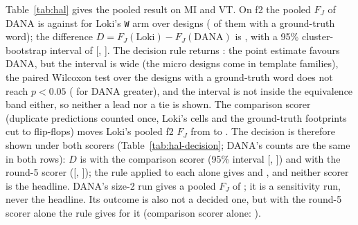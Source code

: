 \documentclass[conference]{IEEEtran}
\newcommand{\code}[1]{\texttt{#1}}
\begin{document}
Table~\ref{tab:hal} gives the pooled result on MI and VT. On f2 the pooled $F_J$ of DANA is
\halFoneHal{} against \halFoneLoki{} for Loki's \code{W} arm over \halDesigns{} designs
(\halDesignsGt{} of them with a ground-truth word); the difference
$D = F_J(\text{Loki}) - F_J(\text{DANA})$ is \halD{}, with a 95\% cluster-bootstrap interval of
[\halCiLo, \halCiHi]. The decision rule returns \emph{\halOutcome}: the point estimate
favours DANA, but the interval is wide (the micro designs come in template families), the paired
Wilcoxon test over the designs with a ground-truth word does not reach $p<0.05$ (\halPHal{} for DANA
greater), and the interval is not inside the equivalence band either, so neither a lead nor a tie is
shown. The comparison scorer (duplicate predictions counted once, Loki's cells and the
ground-truth footprints cut to flip-flops) moves Loki's pooled f2 $F_J$ from \halRFiveFTwoFJ{} to \halFoneLoki{}. The decision is therefore
shown under both scorers (Table~\ref{tab:hal-decision}; DANA's counts are the same in both rows):
$D$ is \halScorerCmpD{} with the comparison scorer (95\% interval [\halScorerCmpCiLo,
\halScorerCmpCiHi]) and \halScorerFiveD{} with the round-5 scorer ([\halScorerFiveCiLo,
\halScorerFiveCiHi]); the rule applied to each alone gives \emph{\halScorerCmpOutcome} and
\emph{\halScorerFiveOutcome}, and neither scorer is the headline. DANA's size-2 run gives a pooled
$F_J$ of \halHalTwoFTwoFJ{}; it is a sensitivity run, never the headline. Its outcome
is also not a decided one, but with the round-5 scorer alone the rule gives
\emph{\halTwoScorerFiveOutcome} for it (comparison scorer alone: \emph{\halTwoScorerCmpOutcome}).
\end{document}
